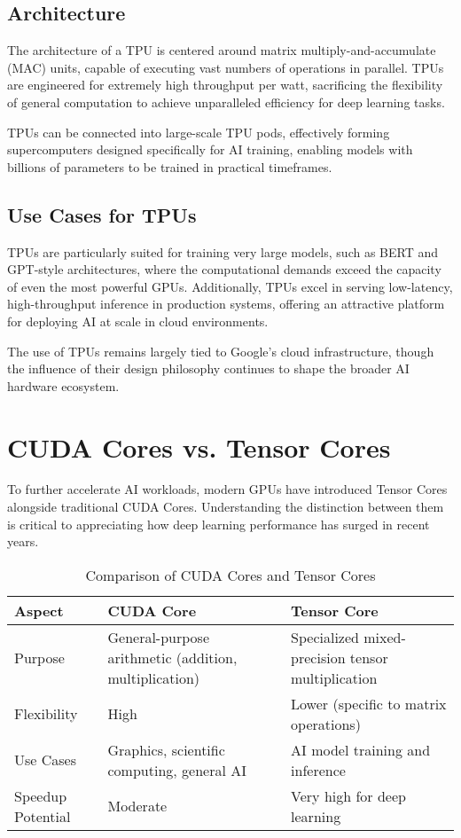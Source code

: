 \documentclass[openany]{book}
\begin{document}
\subsection{Architecture}
The architecture of a TPU is centered around matrix multiply-and-accumulate 
(MAC) units, capable of executing vast numbers of operations in parallel. TPUs 
are engineered for extremely high throughput per watt, sacrificing the 
flexibility of general computation to achieve unparalleled efficiency for deep 
learning tasks.

TPUs can be connected into large-scale TPU pods, effectively forming 
supercomputers designed specifically for AI training, enabling models with 
billions of parameters to be trained in practical timeframes.

\subsection{Use Cases for TPUs}
TPUs are particularly suited for training very large models, such as BERT and 
GPT-style architectures, where the computational demands exceed the capacity of 
even the most powerful GPUs. Additionally, TPUs excel in serving low-latency, 
high-throughput inference in production systems, offering an attractive platform 
for deploying AI at scale in cloud environments.

The use of TPUs remains largely tied to Google's cloud infrastructure, though 
the influence of their design philosophy continues to shape the broader AI 
hardware ecosystem.

\section{CUDA Cores vs. Tensor Cores}

To further accelerate AI workloads, modern GPUs have introduced Tensor Cores 
alongside traditional CUDA Cores. Understanding the distinction between them is 
critical to appreciating how deep learning performance has surged in recent 
years.

\begin{table}[h]
\centering
\begin{tabular}{|l|l|l|}
\hline
\textbf{Aspect} & \textbf{CUDA Core} & \textbf{Tensor Core} \\ \hline
Purpose & General-purpose arithmetic (addition, multiplication) & Specialized 
mixed-precision tensor multiplication \\ \hline
Flexibility & High & Lower (specific to matrix operations) \\ \hline
Use Cases & Graphics, scientific computing, general AI & AI model training and 
inference \\ \hline
Speedup Potential & Moderate & Very high for deep learning \\ \hline
\end{tabular}
\caption{Comparison of CUDA Cores and Tensor Cores}
\end{table}
\end{document}

